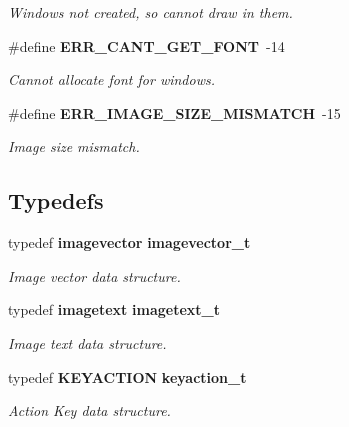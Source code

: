 \begin{CompactItemize}
\begin{CompactList}\small\item\em Windows not created, so cannot draw in them. \item\end{CompactList}\item 
\#define {\bf ERR\_\-CANT\_\-GET\_\-FONT}\ -14\label{xtv_8h_a50}

\begin{CompactList}\small\item\em Cannot allocate font for windows. \item\end{CompactList}\item 
\#define {\bf ERR\_\-IMAGE\_\-SIZE\_\-MISMATCH}\ -15\label{xtv_8h_a51}

\begin{CompactList}\small\item\em Image size mismatch. \item\end{CompactList}\end{CompactItemize}
\subsection*{Typedefs}
\begin{CompactItemize}
\item 
typedef {\bf imagevector} {\bf imagevector\_\-t}\label{xtv_8h_a56}

\begin{CompactList}\small\item\em Image vector data structure. \item\end{CompactList}\item 
typedef {\bf imagetext} {\bf imagetext\_\-t}\label{xtv_8h_a57}

\begin{CompactList}\small\item\em Image text data structure. \item\end{CompactList}\item 
typedef {\bf KEYACTION} {\bf keyaction\_\-t}\label{xtv_8h_a58}

\begin{CompactList}\small\item\em Action Key data structure. \item\end{CompactList}\end{CompactItemize}
